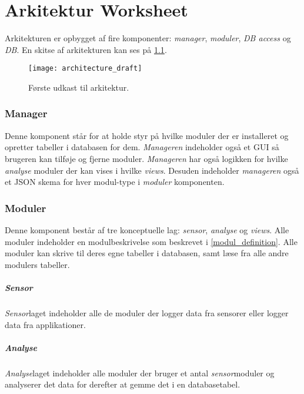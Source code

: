\chapter{Arkitektur Worksheet}
Arkitekturen er opbygget af fire komponenter: \textit{manager}, \textit{moduler}, \textit{DB access} og \textit{DB}.
En skitse af arkitekturen kan ses på \cref{arkitektur_udkast_1}.
\begin{figure}[h]
	\texttt{[image: architecture\_draft]}
	\caption{Første udkast til arkitektur.}
  \label{arkitektur_udkast_1}
\end{figure}

\subsection*{Manager}
Denne komponent står for at holde styr på hvilke moduler der er installeret og opretter tabeller i databasen for dem.
\textit{Manageren} indeholder også et GUI så brugeren kan tilføje og fjerne moduler.
\textit{Manageren} har også logikken for hvilke \textit{analyse} moduler der kan vises i hvilke \textit{views}.
Desuden indeholder \textit{manageren} også et JSON skema for hver modul-type i \textit{moduler} komponenten.

\subsection*{Moduler}
Denne komponent består af tre konceptuelle lag: \textit{sensor}, \textit{analyse} og \textit{views}.
Alle moduler indeholder en modulbeskrivelse som beskrevet i \cref{modul_definition}. 
Alle moduler kan skrive til deres egne tabeller i databasen, samt læse fra alle andre modulers tabeller.

\paragraph{Sensor} \textit{Sensor}laget indeholder alle de moduler der logger data fra sensorer eller logger data fra applikationer.

\paragraph{Analyse}
\textit{Analyse}laget indeholder alle moduler der bruger et antal \textit{sensor}moduler og analyserer det data for derefter at gemme det i en databasetabel.


